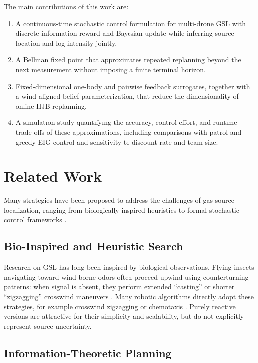 \documentclass{article}
\begin{document}
The main contributions of this work are:
\begin{enumerate}
  \item A continuous-time stochastic control formulation for multi-drone GSL with discrete information reward and Bayesian update while inferring source location and log-intensity jointly.
  \item A Bellman fixed point that approximates repeated replanning beyond the next measurement without imposing a finite terminal horizon.
  \item Fixed-dimensional one-body and pairwise feedback surrogates, together with a wind-aligned belief parameterization, that reduce the dimensionality of online HJB replanning.
  \item A simulation study quantifying the accuracy, control-effort, and runtime trade-offs of these approximations, including comparisons with patrol and greedy EIG control and sensitivity to discount rate and team size.
\end{enumerate}

\section{Related Work}
\label{sec:related_work}

Many strategies have been proposed to address the challenges of gas source localization, ranging from biologically inspired heuristics to formal stochastic control frameworks \cite{francis2022gslReview}.

\subsection{Bio-Inspired and Heuristic Search}

Research on GSL has long been inspired by biological observations.
Flying insects navigating toward wind-borne odors often proceed upwind using counterturning patterns: when signal is absent, they perform extended ``casting'' or shorter ``zigzagging'' crosswind maneuvers \cite{kennedy83zigzagging}.
Many robotic algorithms directly adopt these strategies, for example crosswind zigzagging \cite{li2001crosswindimportance} or chemotaxis \cite{russel03chemotaxis}.
Purely reactive versions are attractive for their simplicity and scalability, but do not explicitly represent source uncertainty.

\subsection{Information-Theoretic Planning}
\end{document}
